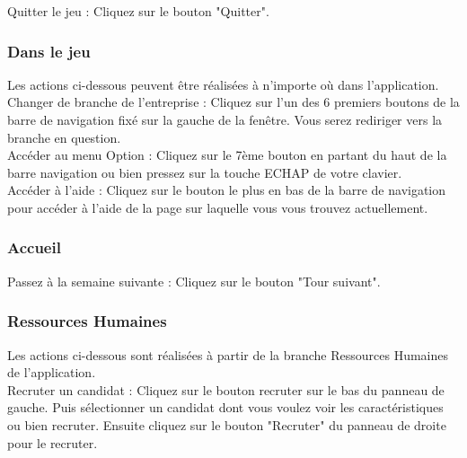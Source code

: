 Quitter le jeu : Cliquez sur le bouton "Quitter".\\



\subsubsection*{Dans le jeu}



Les actions ci-dessous peuvent être réalisées à n'importe où dans l'application.\\

Changer de branche de l'entreprise : Cliquez sur l'un des 6 premiers boutons de la barre de navigation fixé sur la gauche de la fenêtre. Vous serez rediriger vers la branche en question.\\

Accéder au menu Option : Cliquez sur le 7ème bouton en partant du haut de la barre navigation ou bien pressez sur la touche ECHAP de votre clavier.\\

Accéder à l'aide : Cliquez sur le bouton le plus en bas de la barre de navigation pour accéder à l'aide de la page sur laquelle vous vous trouvez actuellement.\\



\subsubsection*{Accueil}



Passez à la semaine suivante : Cliquez sur le bouton "Tour suivant".\\



\subsubsection*{Ressources Humaines}



Les actions ci-dessous sont réalisées à partir de la branche Ressources Humaines de l'application.\\

Recruter un candidat : Cliquez sur le bouton recruter sur le bas du panneau de gauche. Puis sélectionner un candidat dont vous voulez voir les caractéristiques ou bien recruter. Ensuite cliquez sur le bouton "Recruter" du panneau de droite pour le recruter.\\

